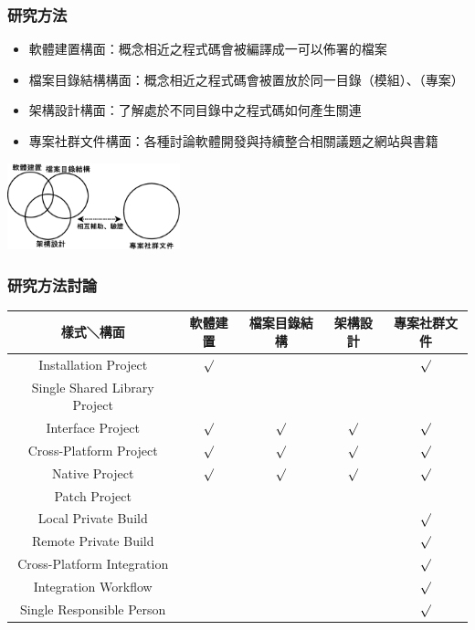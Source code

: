 \documentclass[utf8x]{beamer}
\begin{document}
 \begin{frame}%
 \frametitle{研究方法}
 \begin{itemize}
 \setlength{\itemindent}{1em}
 \item[] 軟體建置構面：概念相近之程式碼會被編譯成一可以佈署的檔案
 \item[] 檔案目錄結構構面：概念相近之程式碼會被置放於同一目錄（模組）、（專案）
 \item[] 架構設計構面：了解處於不同目錄中之程式碼如何產生關連
 \item[] 專案社群文件構面：各種討論軟體開發與持續整合相關議題之網站與書籍
 \end{itemize}
 \begin{center}
 \includegraphics[width=5cm]{observation_view.eps}
 \end{center}
 \end{frame}

\begin{frame}
\frametitle{研究方法討論}
\begin{table}[!htbp]
\fontsize{9pt}{10pt}\selectfont
	\setlength{\abovecaptionskip}{0pt}
	\setlength{\belowcaptionskip}{10pt}
	\begin{center}
\begin{tabular}[width=\textwidth]{|c|c|c|c|c|}
\hline
樣式＼構面&軟體建置&檔案目錄結構&架構設計&專案社群文件\\
\hline
Installation Project&${\surd}$&&&${\surd}$\\
\hline
Single Shared Library Project&&&&\\
\hline
Interface Project&${\surd}$&${\surd}$&${\surd}$&${\surd}$\\
\hline
Cross-Platform Project&${\surd}$&${\surd}$&${\surd}$&${\surd}$\\
\hline
Native Project&${\surd}$&${\surd}$&${\surd}$&${\surd}$\\
\hline
Patch Project&&&&\\
\hline
Local Private Build&&&&${\surd}$\\
\hline
Remote Private Build&&&&${\surd}$\\
\hline
Cross-Platform Integration&&&&${\surd}$\\
\hline
Integration Workflow&&&&${\surd}$\\
\hline
Single Responsible Person&&&&${\surd}$\\
\hline
\end{tabular}
\end{center}
\end{table}
\end{frame}
\end{document}
